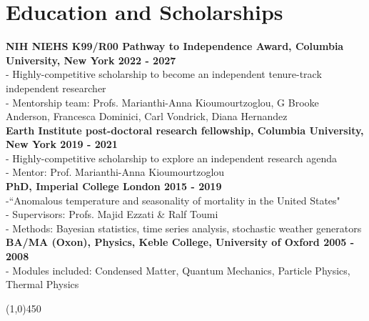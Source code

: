 \section*{Education and Scholarships}

\textbf{NIH NIEHS K99/R00 Pathway to Independence Award, Columbia University, New York \hfill 2022 - 2027}\\
- Highly-competitive scholarship to become an independent tenure-track independent researcher\\
- Mentorship team: Profs. Marianthi-Anna Kioumourtzoglou, G Brooke Anderson, Francesca Dominici, Carl Vondrick, Diana Hernandez\\

\noindent \textbf{Earth Institute post-doctoral research fellowship, Columbia University, New York \hfill 2019 - 2021}\\
- Highly-competitive scholarship to explore an independent research agenda\\
- Mentor: Prof. Marianthi-Anna Kioumourtzoglou\\%



\noindent \textbf{PhD, Imperial College London \hfill 2015 - 2019}						\\
-``Anomalous temperature and seasonality of mortality in the United States"				\\	 		
- Supervisors: Profs. Majid Ezzati \& Ralf Toumi						    \\
- Methods: Bayesian statistics, time series analysis, stochastic weather generators		\\

\noindent \textbf{BA/MA (Oxon), Physics, Keble College, University of Oxford \hfill 2005 - 2008}			                    			\\
- Modules included: Condensed Matter,  Quantum Mechanics, Particle Physics, Thermal Physics		                             

\begin{center} \line(1,0){450} \end{center}